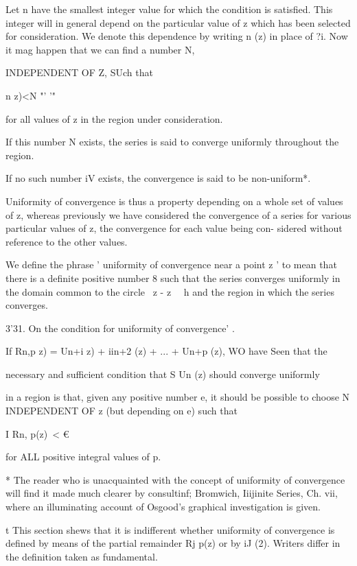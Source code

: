 Let n have the smallest integer value for which the condition is
satisfied. This integer will in general depend on the particular value
of z which has been selected for consideration. We denote this
dependence by writing n (z) in place of ?i. Now it mag happen that we
can find a number N,

INDEPENDENT OF Z, SUch that

n z)<N "' '"

for all values of z in the region under consideration.

If this number N exists, the series is said to converge uniformly
throughout the region.

If no such number iV exists, the convergence is said to be
non-uniform*.

Uniformity of convergence is thus a property depending on a whole set
of values of z, whereas previously we have considered the convergence
of a series for various particular values of z, the convergence for
each value being con- sidered without reference to the other values.

We define the phrase ' uniformity of convergence near a point z ' to
mean that there is a definite positive number 8 such that the series
converges uniformly in the domain common to the circle \ z - z \ \ h
and the region in which the series converges.

3'31. On the condition for uniformity of convergence' .

If Rn,p z) = Un+i z) + iin+2 (z) + ... + Un+p (z), WO have Seen that
the

necessary and sufficient condition that S Un (z) should converge
uniformly

in a region is that, given any positive number e, it should be
possible to choose N INDEPENDENT OF z (but depending on e) such that

I Rn, p(z)\ < €

for ALL positive integral values of p.

* The reader who is unacquainted with the concept of uniformity of
convergence will find it made much clearer by consultinf; Bromwich,
Iiijinite Series, Ch. vii, where an illuminating account of Osgood's
graphical investigation is given.

t This section shews that it is indifferent whether uniformity of
convergence is defined by means of the partial remainder Rj p(z) or by
iJ (2). Writers differ in the definition taken as fundamental.



